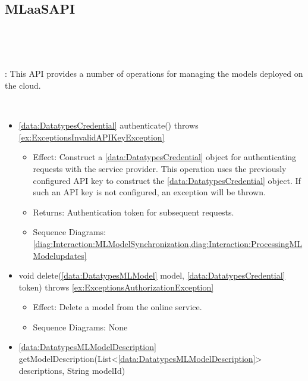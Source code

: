   \subsection{MLaaSAPI}\label{int:InterfacesMLaaSAPI}
    \begin{description}
      \item[Provided by:] \iconcomponent{}~
      \item[Required by:] \iconcomponent{}~ 
           \item[Description]: This API provides a number of operations for managing the models deployed on the  cloud.
      \item[Operations:] ~
    \begin{itemize}[noitemsep,nolistsep,leftmargin=-.25cm]
      \item \textsf{\ref{data:DatatypesCredential} authenticate() throws \ref{ex:ExceptionsInvalidAPIKeyException}}
        \begin{itemize}[noitemsep,nolistsep]
           \item Effect: Construct a \ref{data:DatatypesCredential} object for authenticating requests with the  service provider. This operation uses the previously configured API key to construct the \ref{data:DatatypesCredential} object. If such an API key is not configured, an exception will be thrown. 
           \item Returns: Authentication token for subsequent requests.
           \item Sequence Diagrams: \cref{diag:Interaction:MLModelSynchronization,diag:Interaction:ProcessingMLModelupdates}
        \end{itemize}
      \item \textsf{void delete(\ref{data:DatatypesMLModel} model, \ref{data:DatatypesCredential} token) throws \ref{ex:ExceptionsAuthorizationException}}
        \begin{itemize}[noitemsep,nolistsep]
           \item Effect: Delete a model from the online  service. 
           \item Sequence Diagrams: None
        \end{itemize}
      \item \textsf{\ref{data:DatatypesMLModelDescription} getModelDescription(List\textless{}\ref{data:DatatypesMLModelDescription}\textgreater{} descriptions, String modelId)}

\end{itemize}
\end{description}
